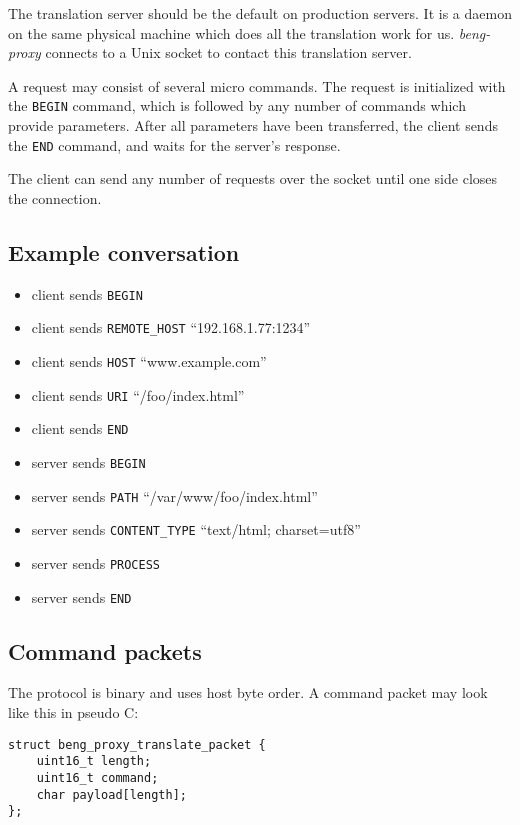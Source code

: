 \documentclass[a4paper,12pt]{article}
\begin{document}
The translation server should be the default on production servers.
It is a daemon on the same physical machine which does all the
translation work for us.  \emph{beng-proxy} connects to a Unix socket
to contact this translation server.

A request may consist of several micro commands.  The request is
initialized with the \texttt{BEGIN} command, which is followed by any
number of commands which provide parameters.  After all parameters
have been transferred, the client sends the \texttt{END} command,
and waits for the server's response.

The client can send any number of requests over the socket until one
side closes the connection.

\subsection{Example conversation}

\begin{itemize}
\item client sends \verb|BEGIN|
\item client sends \verb|REMOTE_HOST| ``192.168.1.77:1234''
\item client sends \verb|HOST| ``www.example.com''
\item client sends \verb|URI| ``/foo/index.html''
\item client sends \verb|END|
\item server sends \verb|BEGIN|
\item server sends \verb|PATH| ``/var/www/foo/index.html''
\item server sends \verb|CONTENT_TYPE| ``text/html; charset=utf8''
\item server sends \verb|PROCESS|
\item server sends \verb|END|
\end{itemize}

\subsection{Command packets}

The protocol is binary and uses host byte order.  A command packet may
look like this in pseudo C:

\begin{verbatim}
struct beng_proxy_translate_packet {
    uint16_t length;
    uint16_t command;
    char payload[length];
};
\end{verbatim}
\end{document}
